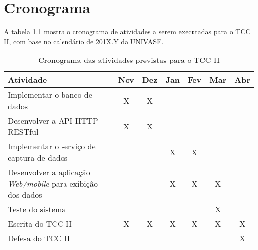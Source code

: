 \chapter{Cronograma}

A tabela \ref{tab:cronograma} mostra o cronograma de atividades a serem executadas para o TCC II, com base no calendário de 201X.Y da UNIVASF.

\newpage
\begin{table}[!thb]
   \centering
   \caption{\label{tab:cronograma} Cronograma das atividades previstas para o TCC II}
   \begin{adjustbox}{max width=\textwidth}
   \begin{tabular}{p{6.5cm}|c|c|c|c|c|c}
   \toprule
   \textbf{Atividade}                      & Nov & Dez & Jan & Fev & Mar & Abr \\ \hline
   Implementar o banco de dados              & X    & X     &       &        &          &          \\ \hline
   Desenvolver a API HTTP RESTful                      &   X   & X     &       &        &          &          \\ \hline
   Implementar o serviço de captura de dados        &      &      & X     &   X     &          &          \\ \hline
   Desenvolver a aplicação \textit{Web/mobile} para exibição dos dados         &      &      & X     &   X     &     X     &          \\ \hline
   Teste do sistema            &      &       &       &        & X        &          \\ \hline
   Escrita do TCC II                       &   X   & X     & X     & X      & X        & X        \\ \hline
  Defesa do TCC II                        &      &       &       &        &          & X       \\
   \bottomrule
   \end{tabular}
   \end{adjustbox}
\end{table}